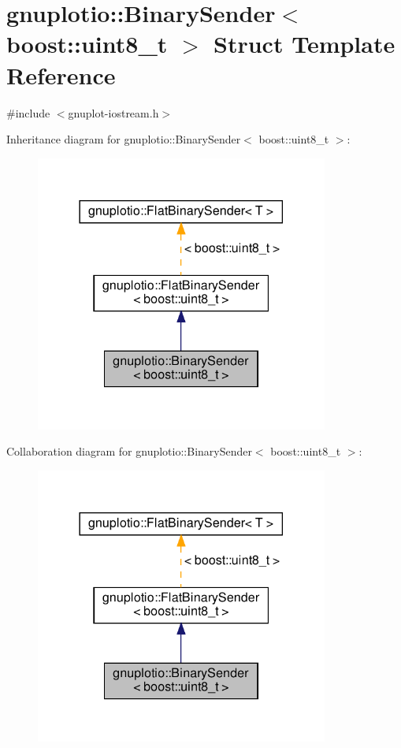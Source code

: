 \hypertarget{structgnuplotio_1_1_binary_sender_3_01boost_1_1uint8__t_01_4}{}\section{gnuplotio\+:\+:Binary\+Sender$<$ boost\+:\+:uint8\+\_\+t $>$ Struct Template Reference}
\label{structgnuplotio_1_1_binary_sender_3_01boost_1_1uint8__t_01_4}


{\ttfamily \#include $<$gnuplot-\/iostream.\+h$>$}



Inheritance diagram for gnuplotio\+:\+:Binary\+Sender$<$ boost\+:\+:uint8\+\_\+t $>$\+:
\nopagebreak
\begin{figure}[H]
\begin{center}
\leavevmode
\includegraphics[width=273pt]{structgnuplotio_1_1_binary_sender_3_01boost_1_1uint8__t_01_4__inherit__graph}
\end{center}
\end{figure}


Collaboration diagram for gnuplotio\+:\+:Binary\+Sender$<$ boost\+:\+:uint8\+\_\+t $>$\+:
\nopagebreak
\begin{figure}[H]
\begin{center}
\leavevmode
\includegraphics[width=273pt]{structgnuplotio_1_1_binary_sender_3_01boost_1_1uint8__t_01_4__coll__graph}
\end{center}
\end{figure}
